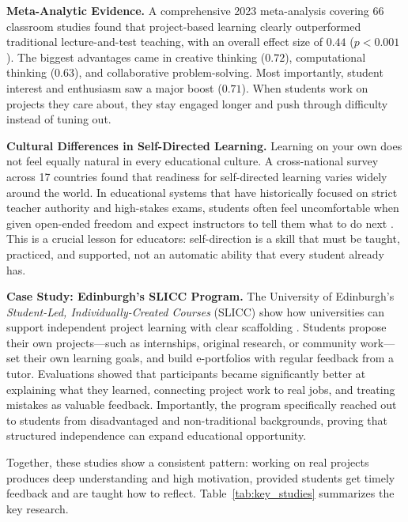 \documentclass[11pt]{article}
\begin{document}
\textbf{Meta-Analytic Evidence.} A comprehensive 2023 meta-analysis covering 66 classroom studies \citep{zheng2023meta} found that project-based learning clearly outperformed traditional lecture-and-test teaching, with an overall effect size of $0.44$ ($p < 0.001$). The biggest advantages came in creative thinking ($0.72$), computational thinking ($0.63$), and collaborative problem-solving. Most importantly, student interest and enthusiasm saw a major boost ($0.71$). When students work on projects they care about, they stay engaged longer and push through difficulty instead of tuning out.

\textbf{Cultural Differences in Self-Directed Learning.} Learning on your own does not feel equally natural in every educational culture. A cross-national survey across 17 countries \citep{guglielmino2011} found that readiness for self-directed learning varies widely around the world. In educational systems that have historically focused on strict teacher authority and high-stakes exams, students often feel uncomfortable when given open-ended freedom and expect instructors to tell them what to do next \citep{frambach2012}. This is a crucial lesson for educators: self-direction is a skill that must be taught, practiced, and supported, not an automatic ability that every student already has.

\textbf{Case Study: Edinburgh's SLICC Program.} The University of Edinburgh’s \emph{Student-Led, Individually-Created Courses} (SLICC) show how universities can support independent project learning with clear scaffolding \citep{spiers2020}. Students propose their own projects---such as internships, original research, or community work---set their own learning goals, and build e-portfolios with regular feedback from a tutor. Evaluations showed that participants became significantly better at explaining what they learned, connecting project work to real jobs, and treating mistakes as valuable feedback. Importantly, the program specifically reached out to students from disadvantaged and non-traditional backgrounds, proving that structured independence can expand educational opportunity.

Together, these studies show a consistent pattern: working on real projects produces deep understanding and high motivation, provided students get timely feedback and are taught how to reflect. Table~\ref{tab:key_studies} summarizes the key research.
\end{document}
